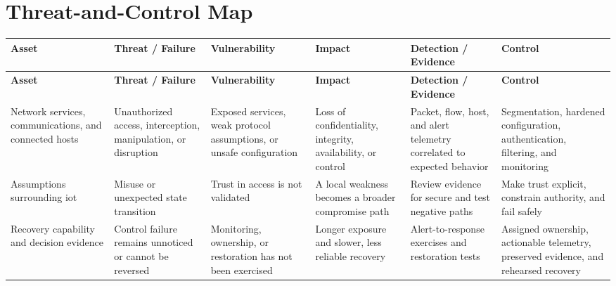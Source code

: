 \documentclass[11pt,letterpaper]{article}
\begin{document}
\section*{Threat-and-Control Map}
\begingroup\scriptsize\setlength{\tabcolsep}{2pt}
\begin{longtable}{>{\raggedright\arraybackslash}p{}>{\raggedright\arraybackslash}p{}>{\raggedright\arraybackslash}p{}>{\raggedright\arraybackslash}p{}>{\raggedright\arraybackslash}p{}>{\raggedright\arraybackslash}p{}}
\toprule\rowcolor{Navy}\color{white}\textbf{Asset} & \color{white}\textbf{Threat / Failure} & \color{white}\textbf{Vulnerability} & \color{white}\textbf{Impact} & \color{white}\textbf{Detection / Evidence} & \color{white}\textbf{Control}\\\midrule
\endfirsthead
\toprule\rowcolor{Navy}\color{white}\textbf{Asset} & \color{white}\textbf{Threat / Failure} & \color{white}\textbf{Vulnerability} & \color{white}\textbf{Impact} & \color{white}\textbf{Detection / Evidence} & \color{white}\textbf{Control}\\\midrule
\endhead
Network services, communications, and connected hosts & Unauthorized access, interception, manipulation, or disruption & Exposed services, weak protocol assumptions, or unsafe configuration & Loss of confidentiality, integrity, availability, or control & Packet, flow, host, and alert telemetry correlated to expected behavior & Segmentation, hardened configuration, authentication, filtering, and monitoring\\\midrule
Assumptions surrounding iot & Misuse or unexpected state transition & Trust in access is not validated & A local weakness becomes a broader compromise path & Review evidence for secure and test negative paths & Make trust explicit, constrain authority, and fail safely\\\midrule
Recovery capability and decision evidence & Control failure remains unnoticed or cannot be reversed & Monitoring, ownership, or restoration has not been exercised & Longer exposure and slower, less reliable recovery & Alert-to-response exercises and restoration tests & Assigned ownership, actionable telemetry, preserved evidence, and rehearsed recovery\\\midrule
\bottomrule
\end{longtable}
\endgroup
\end{document}
